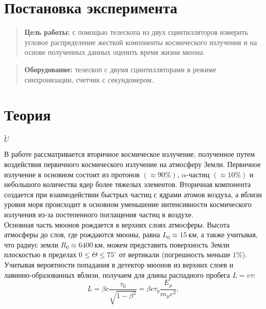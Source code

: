 \documentclass{lab}
\begin{document}

\section*{Постановка эксперимента}

\begin{quote}
	\textbf{{\normalsize Цель работы: }}
	с помощью телескопа из двух сцинтилляторов измерить угловое распределение жесткой компоненты космического излучения и на основе полученных данных оценить время жизни мюона.
\end{quote}

\begin{quote}
	\textbf{{\normalsize Оборудование: }}
	телескоп с двумя сцинтилляторами в режиме синхронизации, счетчик с секундомером.
\end{quote}

\section*{Теория}

$\widetilde{U}$

В работе рассматривается вторичное космическое излучение, полученное путем воздействия первичного космического излучение на атмосферу Земли. Первичное излучение в основном состоит из протонов $ (\approx 90\%) $, $ \alpha $-частиц $ (\approx 10\%) $ и небольшого количества ядер более тяжелых элементов. Вторичная компонента создается при взаимодействии быстрых частиц с ядрами атомов воздуха, а вблизи уровня моря происходит в основном уменьшение интенсивности космического излучения из-за постепенного поглащения частиц в воздухе.\\

Основная часть мюонов рождается в верхних слоях атмосферы. Высота атмосферы до слоя, где рождаются мюоны, равна $ L_0 \approx 15~км $, а также учитывая, что радиус земли $ R_0 \approx 6400~км $, можем представить поверхность Земли плоскостью в пределах $ 0 \leqslant \Theta \leqslant 75^{\circ} $ от вертикали (погрешность меньше $ 1\% $).\\

Учитывая вероятности попадания в детектор мюонов из верхних слоев и лавинно-образованных вблизи, получаем для длины распадного пробега $ L = v\tau $:
\begin{equation}\label{eq-1}
L = \beta c \dfrac{\tau_0}{\sqrt{1 - \beta^2}} = \beta c \tau_0 \dfrac{E_{\mu}}{m_{\mu} c^2},
\end{equation}
\end{document}
